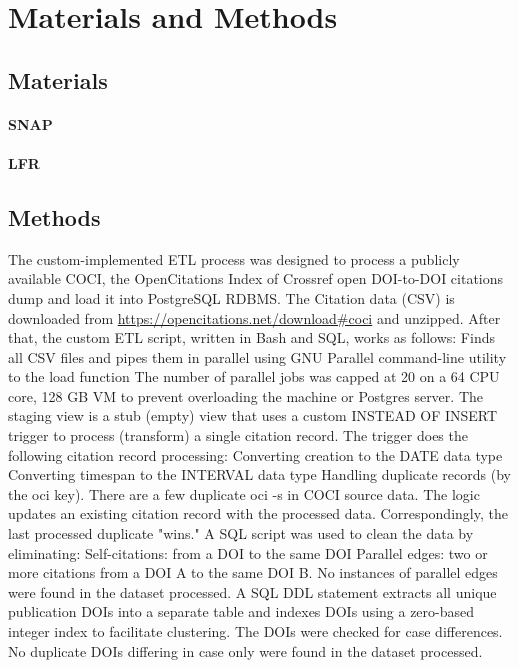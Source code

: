 \documentclass[12pt, oneside]{article}   	%
\begin{document}
\section{Materials and Methods}

\subsection{Materials}

\paragraph{SNAP}

\paragraph{LFR}


	
\subsection{Methods} 

The custom-implemented ETL process was designed to process a publicly available COCI, the OpenCitations Index of Crossref open DOI-to-DOI citations dump and load it into PostgreSQL RDBMS. 
The Citation data (CSV) is downloaded from \url{https://opencitations.net/download#coci} and unzipped. After that, the custom ETL script, written in Bash and SQL, works as follows:
Finds all CSV files and pipes them in parallel using GNU Parallel command-line utility to the load function
The number of parallel jobs was capped at 20 on a 64 CPU core, 128 GB VM to prevent overloading the machine or Postgres server.
The staging view is a stub (empty) view that uses a custom INSTEAD OF INSERT trigger to process (transform) a single citation record.
The trigger does the following citation record processing:
Converting creation to the DATE data type
Converting timespan to the INTERVAL data type
Handling duplicate records (by the oci key). There are a few duplicate oci -s in COCI source data. The logic updates an existing citation record with the processed data. Correspondingly, the last processed duplicate "wins."
A SQL script was used to clean the data by eliminating:
Self-citations: from a DOI to the same DOI
Parallel edges: two or more citations from a DOI A to the same DOI B. No instances of parallel edges were found in the dataset processed.
A SQL DDL statement extracts all unique publication DOIs into a separate table and indexes DOIs using a zero-based integer index to facilitate clustering.
The DOIs were checked for case differences. No duplicate DOIs differing in case only were found in the dataset processed.
\end{document}
